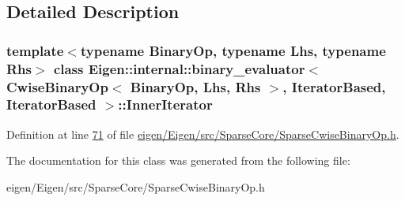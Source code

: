 \subsection{Detailed Description}
\subsubsection*{template$<$typename Binary\+Op, typename Lhs, typename Rhs$>$\newline
class Eigen\+::internal\+::binary\+\_\+evaluator$<$ Cwise\+Binary\+Op$<$ Binary\+Op, Lhs, Rhs $>$, Iterator\+Based, Iterator\+Based $>$\+::\+Inner\+Iterator}



Definition at line \hyperlink{eigen_2_eigen_2src_2_sparse_core_2_sparse_cwise_binary_op_8h_source_l00071}{71} of file \hyperlink{eigen_2_eigen_2src_2_sparse_core_2_sparse_cwise_binary_op_8h_source}{eigen/\+Eigen/src/\+Sparse\+Core/\+Sparse\+Cwise\+Binary\+Op.\+h}.



The documentation for this class was generated from the following file\+:\begin{DoxyCompactItemize}
\item 
eigen/\+Eigen/src/\+Sparse\+Core/\+Sparse\+Cwise\+Binary\+Op.\+h\end{DoxyCompactItemize}
